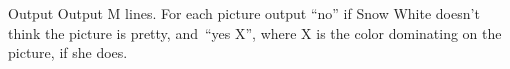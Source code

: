 Output
Output M lines. For each picture output “no” if Snow White doesn't think the picture is pretty, and “yes X”, where X is the color dominating on the picture, if she does.
